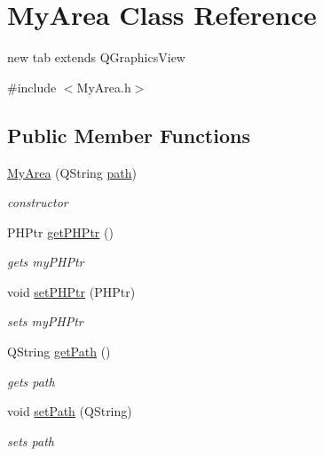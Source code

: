 \hypertarget{class_my_area}{\section{\-My\-Area \-Class \-Reference}
\label{class_my_area}
}


new tab extends \-Q\-Graphics\-View  




{\ttfamily \#include $<$\-My\-Area.\-h$>$}

\subsection*{\-Public \-Member \-Functions}
\begin{DoxyCompactItemize}
\item 
\hyperlink{class_my_area_a31f13e95c83414c538b6c46e55e19c79}{\-My\-Area} (\-Q\-String \hyperlink{class_my_area_a70561a408470de740f580da6717871bf}{path})
\begin{DoxyCompactList}\small\item\em constructor \end{DoxyCompactList}\item 
\hypertarget{class_my_area_a7b94b516e730ddcee16d946c76bbc2b3}{\-P\-H\-Ptr \hyperlink{class_my_area_a7b94b516e730ddcee16d946c76bbc2b3}{get\-P\-H\-Ptr} ()}\label{class_my_area_a7b94b516e730ddcee16d946c76bbc2b3}

\begin{DoxyCompactList}\small\item\em gets my\-P\-H\-Ptr \end{DoxyCompactList}\item 
\hypertarget{class_my_area_a087c389370070a348af025aaee620fc8}{void \hyperlink{class_my_area_a087c389370070a348af025aaee620fc8}{set\-P\-H\-Ptr} (\-P\-H\-Ptr)}\label{class_my_area_a087c389370070a348af025aaee620fc8}

\begin{DoxyCompactList}\small\item\em sets my\-P\-H\-Ptr \end{DoxyCompactList}\item 
\hypertarget{class_my_area_a84edb9791a8c988cb9f13ac1ef2025d5}{\-Q\-String \hyperlink{class_my_area_a84edb9791a8c988cb9f13ac1ef2025d5}{get\-Path} ()}\label{class_my_area_a84edb9791a8c988cb9f13ac1ef2025d5}

\begin{DoxyCompactList}\small\item\em gets path \end{DoxyCompactList}\item 
\hypertarget{class_my_area_ab1f574dcb5318131128deb076743f01a}{void \hyperlink{class_my_area_ab1f574dcb5318131128deb076743f01a}{set\-Path} (\-Q\-String)}\label{class_my_area_ab1f574dcb5318131128deb076743f01a}

\begin{DoxyCompactList}\small\item\em sets path \end{DoxyCompactList}\end{DoxyCompactItemize}

